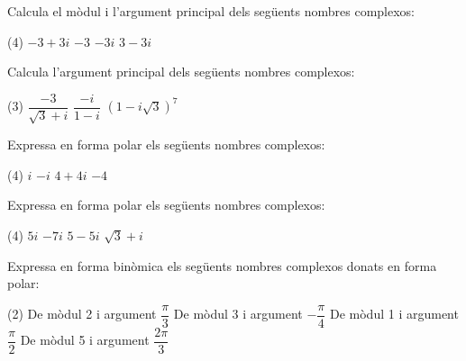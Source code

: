 
 \begin{mylist}
 	
	\exer  
	Calcula el mòdul i l'argument principal dels següents nombres
 	complexos:

	\begin{tasks}(4)
		\task  $-3+3i$
		\task  $-3$
		\task $-3i$
		\task $3-3i$
	\end{tasks}
\answers[cols=1]{[$|z|=\sqrt{18}$;  $arg(z)=135^\circ$,
	$|z|=3$;  $arg(z)=180^\circ$,
	$|z|=3$;  $arg(z)=270^\circ$,
	$|z|=\sqrt{18}$;  $arg(z)=-45^\circ$]}


\exer Calcula l'argument principal dels següents nombres
complexos:

\begin{tasks}(3)
	\task  $\dfrac{-3}{\sqrt{3} + i}$
	\task  $\dfrac{-i}{1-i}$
	\task  $(1-i\sqrt{3})^7$
\end{tasks}
 \answers{[$z=\frac{3}{4}(-\sqrt{3}+i)$; $arg(z)=150^\circ$,
		  $z=\frac{1}{2}(1-i)$; $arg(z)=-45^\circ$,
		  $z=\left[2_{-60^\circ}\right]^7$; $arg(z)=-420^\circ=-60^\circ$]}
 
	\exer
	Expressa en forma polar els següents nombres complexos:

	\begin{tasks}(4)
		\task $i$ 
		\task $-i$
		\task $4 + 4i$ 
		\task $-4$
	\end{tasks}

	
	\exer
	Expressa en forma polar els següents nombres complexos:

	\begin{tasks}(4)
		\task $5i$ 
		\task $-7i$
		\task $5 - 5i$ 
		\task $\sqrt{3}+i$

	\end{tasks}
	
	\exer[1] Expressa en forma binòmica els següents nombres complexos donats en forma polar:
	\begin{tasks}(2)
		\task De mòdul 2 i argument $\dfrac{\pi}{3}$
		\task De mòdul 3 i argument $-\dfrac{\pi}{4}$
		\task De mòdul 1 i argument $\dfrac{\pi}{2}$
		\task De mòdul 5 i argument $\dfrac{2 \pi}{3}$
	\end{tasks}
\answers[cols=1]{[ 
		 $2_{\,60^\circ}= 1 + \sqrt{3} i$, 
		 $3_{\,-45^\circ}= \frac{3\sqrt{2}}{2} - \frac{3\sqrt{2}}{2} i$, 
		 $1_{\,90^\circ}= i $, 
		 $5_{\,120^\circ}= -\frac{5}{2} + i \frac{5\sqrt{3}}{2}$]}
\end{mylist}
	
